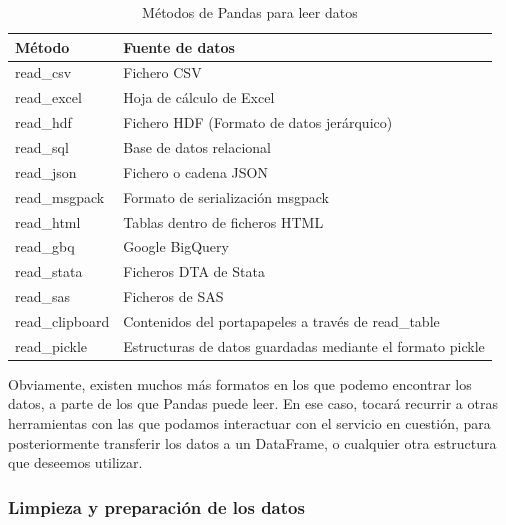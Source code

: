 \begin{table}[h!]
\centering
\label{pandas_readData}
\begin{tabular}{|l|l|}
\hline
\textbf{Método} & \textbf{Fuente de datos}                                  \\ \hline
read\_csv       & Fichero CSV                                               \\ \hline
read\_excel     & Hoja de cálculo de Excel                                  \\ \hline
read\_hdf       & Fichero HDF (Formato de datos jerárquico)                 \\ \hline
read\_sql       & Base de datos relacional                                  \\ \hline
read\_json      & Fichero o cadena JSON                                     \\ \hline
read\_msgpack   & Formato de serialización msgpack                          \\ \hline
read\_html      & Tablas dentro de ficheros HTML                            \\ \hline
read\_gbq       & Google BigQuery                                           \\ \hline
read\_stata     & Ficheros DTA de Stata                                     \\ \hline
read\_sas       & Ficheros de SAS                                           \\ \hline
read\_clipboard & Contenidos del portapapeles a través de read\_table       \\ \hline
read\_pickle    & Estructuras de datos guardadas mediante el formato pickle \\ \hline
\end{tabular}
\caption{Métodos de Pandas para leer datos}
\end{table}

Obviamente, existen muchos más formatos en los que podemo encontrar los datos,
a parte de los que Pandas puede leer. En ese caso, tocará recurrir a otras
herramientas con las que podamos interactuar con el servicio en
cuestión, para posteriormente transferir los datos a un DataFrame, o cualquier
otra estructura que deseemos utilizar.


\subsubsection{Limpieza y preparación de los datos}
\label{subsec:state_dataScience_workflow_1}

